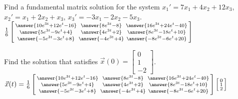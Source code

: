 \documentclass{ximera}
\begin{document}
\begin{exercise}
    Find a fundamental matrix solution for the system $x_1' = 7x_1+4x_2+ 12x_3$, $x_2' = x_1+2x_2+x_3$, $x_3' = -3x_1-2x_2- 5x_3$.\\
    $\frac{1}{6}\left[\begin{smallmatrix} 
        \answer{10e^{3t} + 12e^t - 16} & \answer{8e^{3t} - 8} & \answer{16e^{3t} + 24e^t - 40} \\%
        \answer{5e^{3t} - 9e^t + 4} & \answer{4e^{3t} + 2} & \answer{8e^{3t} - 18e^t + 10} \\%
        \answer{-5e^{3t} - 3e^t + 8} & \answer{-4e^{3t} + 4} & \answer{-8e^{3t} - 6e^t + 20} 
    \end{smallmatrix}\right]$
    
    \begin{problem}
        Find the solution that satisfies $\vec{x}(0) = 
        \left[ \begin{smallmatrix} 
            0 \\ 
            1 \\ 
            -2 
        \end{smallmatrix} \right]$.\\
        
        $\vec{x}(t) = \frac{1}{6}\left[\begin{smallmatrix} 
            \answer{10e^{3t} + 12e^t - 16} & \answer{8e^{3t} - 8} & \answer{16e^{3t} + 24e^t - 40} \\%
            \answer{5e^{3t} - 9e^t + 4} & \answer{4e^{3t} + 2} & \answer{8e^{3t} - 18e^t + 10} \\%
            \answer{-5e^{3t} - 3e^t + 8} & \answer{-4e^{3t} + 4} & \answer{-8e^{3t} - 6e^t + 20} \end{smallmatrix}\right] 
            \left[\begin{smallmatrix} 0 \\ 1 \\ 2 \end{smallmatrix}\right]$
    \end{problem}
\end{exercise}
\end{document}

